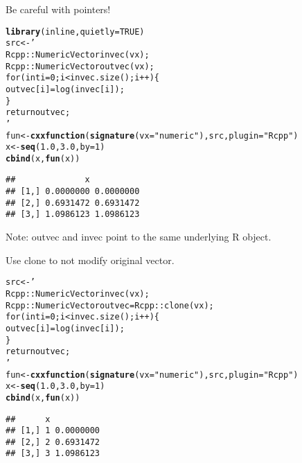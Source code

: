 \documentclass{beamer}\usepackage[]{graphicx}\usepackage[]{color}
\makeatletter
\newcommand{\hlnum}[1]{\textcolor[rgb]{0.686,0.059,0.569}{#1}}%
\newcommand{\hlstr}[1]{\textcolor[rgb]{0.192,0.494,0.8}{#1}}%
\newcommand{\hlstd}[1]{\textcolor[rgb]{0.345,0.345,0.345}{#1}}%
\newcommand{\hlkwb}[1]{\textcolor[rgb]{0.69,0.353,0.396}{#1}}%
\newcommand{\hlkwc}[1]{\textcolor[rgb]{0.333,0.667,0.333}{#1}}%
\newcommand{\hlkwd}[1]{\textcolor[rgb]{0.737,0.353,0.396}{\textbf{#1}}}%
\newenvironment{kframe}{%
 \def\at@end@of@kframe{}%
 \ifinner\ifhmode%
  \def\at@end@of@kframe{\end{minipage}}%
  \begin{minipage}{\columnwidth}%
 \fi\fi%
 \def\FrameCommand##1{\hskip\@totalleftmargin \hskip-\fboxsep
 \colorbox{shadecolor}{##1}\hskip-\fboxsep
     \hskip-\linewidth \hskip-\@totalleftmargin \hskip\columnwidth}%
 \MakeFramed {\advance\hsize-\width
   \@totalleftmargin\z@ \linewidth\hsize
   \@setminipage}}%
 {\par\unskip\endMakeFramed%
 \at@end@of@kframe}
\newenvironment{knitrout}{}{} %
\makeatother
\begin{document}
\begin{frame}[fragile]{Be careful with pointers!}
\begin{knitrout}\footnotesize
{}\color{fgcolor}\begin{kframe}
\begin{alltt}
\hlkwd{library}\hlstd{(inline,} \hlkwc{quietly}\hlstd{=}\hlnum{TRUE}\hlstd{)}
\hlstd{src} \hlkwb{<-} \hlstr{'
    Rcpp::NumericVector invec(vx);
    Rcpp::NumericVector outvec(vx);
    for(int i=0; i<invec.size(); i++) \{
        outvec[i] = log(invec[i]);
    \}
    return outvec;
'}
\hlstd{fun} \hlkwb{<-} \hlkwd{cxxfunction}\hlstd{(}\hlkwd{signature}\hlstd{(}\hlkwc{vx}\hlstd{=}\hlstr{"numeric"}\hlstd{), src,} \hlkwc{plugin}\hlstd{=}\hlstr{"Rcpp"}\hlstd{)}
\hlstd{x} \hlkwb{<-} \hlkwd{seq}\hlstd{(}\hlnum{1.0}\hlstd{,} \hlnum{3.0}\hlstd{,} \hlkwc{by}\hlstd{=}\hlnum{1}\hlstd{)}
\hlkwd{cbind}\hlstd{(x,} \hlkwd{fun}\hlstd{(x))}
\end{alltt}
\begin{verbatim}
##              x          
## [1,] 0.0000000 0.0000000
## [2,] 0.6931472 0.6931472
## [3,] 1.0986123 1.0986123
\end{verbatim}
\end{kframe}
\end{knitrout}
Note: outvec and invec point to the same underlying R object.
\end{frame}
\begin{frame}[fragile]{Use clone to not modify original vector.}
\begin{knitrout}\footnotesize
{}\color{fgcolor}\begin{kframe}
\begin{alltt}
\hlstd{src} \hlkwb{<-} \hlstr{'
    Rcpp::NumericVector invec(vx);
    Rcpp::NumericVector outvec = Rcpp::clone(vx);
    for(int i=0; i<invec.size(); i++) \{
        outvec[i] = log(invec[i]);
    \}
    return outvec;
'}
\hlstd{fun} \hlkwb{<-} \hlkwd{cxxfunction}\hlstd{(}\hlkwd{signature}\hlstd{(}\hlkwc{vx}\hlstd{=}\hlstr{"numeric"}\hlstd{), src,} \hlkwc{plugin}\hlstd{=}\hlstr{"Rcpp"}\hlstd{)}
\hlstd{x} \hlkwb{<-} \hlkwd{seq}\hlstd{(}\hlnum{1.0}\hlstd{,} \hlnum{3.0}\hlstd{,} \hlkwc{by}\hlstd{=}\hlnum{1}\hlstd{)}
\hlkwd{cbind}\hlstd{(x,} \hlkwd{fun}\hlstd{(x))}
\end{alltt}
\begin{verbatim}
##      x          
## [1,] 1 0.0000000
## [2,] 2 0.6931472
## [3,] 3 1.0986123
\end{verbatim}
\end{kframe}
\end{knitrout}
\end{frame}
\end{document}
